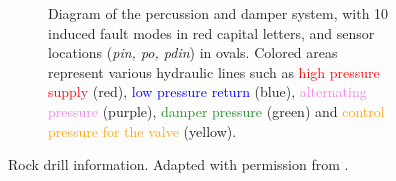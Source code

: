 \begin{figure}[!b]
\begin{center}
\begin{subfigure}[t]{0.6\linewidth}
        \caption{Diagram of the percussion and damper system, with 10 induced fault modes in red capital letters, and sensor locations (\textit{pin, po, pdin}) in ovals. Colored areas represent various hydraulic lines such as \textcolor{red}{high pressure supply} (red), \textcolor{blue}{low pressure return} (blue), \textcolor{violet}{alternating pressure} (purple), \textcolor{ForestGreen}{damper pressure} (green) and \textcolor{orange}{control pressure for the valve} (yellow).}
        \label{fig:phm_3}
    \end{subfigure}
    \caption{Rock drill information. Adapted with permission from \cite{jakobsson2022dataset}.}
    \label{fig:phm_1_3}
  \end{center}
\end{figure}






